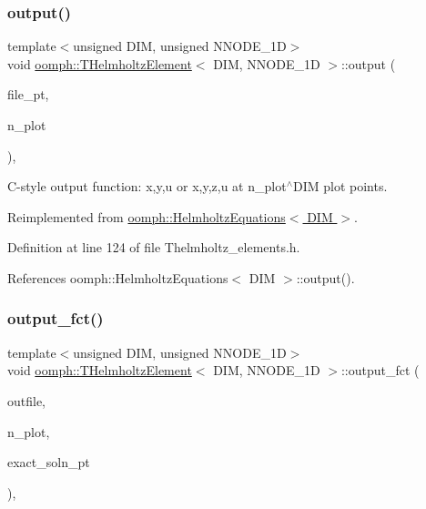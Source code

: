 \subsubsection{\texorpdfstring{output()}{output()}\hspace{0.1cm}{\footnotesize\ttfamily [4/4]}}
{\footnotesize\ttfamily template$<$unsigned D\+IM, unsigned N\+N\+O\+D\+E\+\_\+1D$>$ \\
void \hyperlink{classoomph_1_1THelmholtzElement}{oomph\+::\+T\+Helmholtz\+Element}$<$ D\+IM, N\+N\+O\+D\+E\+\_\+1D $>$\+::output (\begin{DoxyParamCaption}\item[{F\+I\+LE $\ast$}]{file\+\_\+pt,  }\item[{const unsigned \&}]{n\+\_\+plot }\end{DoxyParamCaption})\hspace{0.3cm}{\ttfamily [inline]}, {\ttfamily [virtual]}}



C-\/style output function\+: x,y,u or x,y,z,u at n\+\_\+plot$^\wedge$\+D\+IM plot points. 



Reimplemented from \hyperlink{classoomph_1_1HelmholtzEquations_a0ba883cd70dbbd5664e76b83407f1144}{oomph\+::\+Helmholtz\+Equations$<$ D\+I\+M $>$}.



Definition at line 124 of file Thelmholtz\+\_\+elements.\+h.



References oomph\+::\+Helmholtz\+Equations$<$ D\+I\+M $>$\+::output().

\mbox{\label{classoomph_1_1THelmholtzElement_a38d31ed7eae928a91af0bf96e57f366a}} 
\subsubsection{\texorpdfstring{output\+\_\+fct()}{output\_fct()}\hspace{0.1cm}{\footnotesize\ttfamily [1/2]}}
{\footnotesize\ttfamily template$<$unsigned D\+IM, unsigned N\+N\+O\+D\+E\+\_\+1D$>$ \\
void \hyperlink{classoomph_1_1THelmholtzElement}{oomph\+::\+T\+Helmholtz\+Element}$<$ D\+IM, N\+N\+O\+D\+E\+\_\+1D $>$\+::output\+\_\+fct (\begin{DoxyParamCaption}\item[{std\+::ostream \&}]{outfile,  }\item[{const unsigned \&}]{n\+\_\+plot,  }\item[{\hyperlink{classoomph_1_1FiniteElement_a690fd33af26cc3e84f39bba6d5a85202}{Finite\+Element\+::\+Steady\+Exact\+Solution\+Fct\+Pt}}]{exact\+\_\+soln\+\_\+pt }\end{DoxyParamCaption})\hspace{0.3cm}{\ttfamily [inline]}, {\ttfamily [virtual]}}



